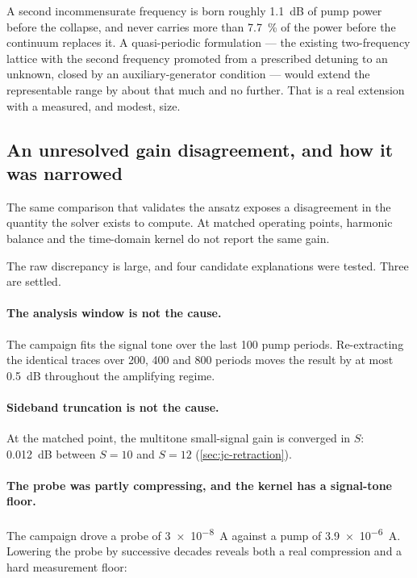 A second incommensurate frequency is born roughly \SI{1.1}{\dB} of pump power
before the collapse, and never carries more than \SI{7.7}{\percent} of the power
before the continuum replaces it. A quasi-periodic formulation --- the existing
two-frequency lattice with the second frequency promoted from a prescribed
detuning to an unknown, closed by an auxiliary-generator condition --- would
extend the representable range by about that much and no further. That is a real
extension with a measured, and modest, size.

\subsection{An unresolved gain disagreement, and how it was narrowed}
\label{sec:gain-gap}

The same comparison that validates the ansatz exposes a disagreement in the
quantity the solver exists to compute. At matched operating points, harmonic
balance and the time-domain kernel do not report the same gain.

The raw discrepancy is large, and four candidate explanations were tested. Three
are settled.

\paragraph{The analysis window is not the cause.} The campaign fits the signal
tone over the last \num{100} pump periods. Re-extracting the identical traces
over \num{200}, \num{400} and \num{800} periods moves the result by at most
\SI{0.5}{\dB} throughout the amplifying regime.

\paragraph{Sideband truncation is not the cause.} At the matched point, the
multitone small-signal gain is converged in $S$: \SI{0.012}{\dB} between $S=10$
and $S=12$ (\cref{sec:jc-retraction}).

\paragraph{The probe was partly compressing, and the kernel has a signal-tone
floor.} The campaign drove a probe of \SI{3e-8}{\ampere} against a pump of
\SI{3.9e-6}{\ampere}. Lowering the probe by successive decades reveals both a
real compression and a hard measurement floor:

